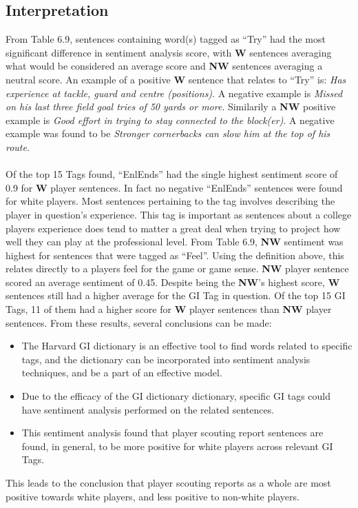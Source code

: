 \documentclass[oneside,12pt]{Classes/RoboticsLaTeX}
\begin{document}
\subsection{Interpretation}
From Table 6.9, sentences containing word(s) tagged as ``Try'' had the most significant difference in sentiment analysis score, with \textbf{W} sentences averaging what would be considered an average score and \textbf{NW} sentences averaging a neutral score. 
An example of a positive \textbf{W} sentence that relates to ``Try'' is: \emph{Has experience at tackle, guard and centre (positions)}. A negative example is \emph{Missed on his last three field goal tries of 50 yards or more}. Similarily a \textbf{NW}
positive example is \emph{Good effort in trying to stay connected to the block(er)}. A negative example was found to be \emph{Stronger cornerbacks can slow him at the top of his route}.
\paragraph{}
Of the top 15 Tags found, ``EnlEnds'' had the single highest sentiment score of 0.9 for \textbf{W} player sentences. In fact no negative ``EnlEnds'' sentences were found for white players. Most sentences pertaining to the tag involves describing the player in
question's experience. This tag is important as sentences about a college players experience  does tend to matter a great deal when trying to project how well they can play at the professional level. From Table 6.9, \textbf{NW} sentiment was highest for sentences
that were tagged as ``Feel''. Using the definition above, this relates directly to a players feel for the game or game sense. \textbf{NW} player sentence scored an average sentiment of 0.45. Despite being the \textbf{NW}'s highest score, \textbf{W} sentences still
had a higher average for the GI Tag in question. Of the top 15 GI Tags, 11 of them had a higher score for \textbf{W} player sentences than \textbf{NW} player sentences.
From these results, several conclusions can be made:
\begin{itemize}
  \item The Harvard GI dictionary is an effective tool to find words related to specific tags, and the dictionary can be incorporated into sentiment analysis techniques, and be a part of an effective model.
  \item Due to the efficacy of the GI dictionary dictionary, specific GI tags could have sentiment analysis performed on the related sentences.
  \item This sentiment analysis found that player scouting report sentences are found, in general, to be more positive for white players across relevant GI Tags.
\end{itemize}
This leads to the conclusion that player scouting reports as a whole are most positive towards white players, and less positive to non-white players.
\end{document}
